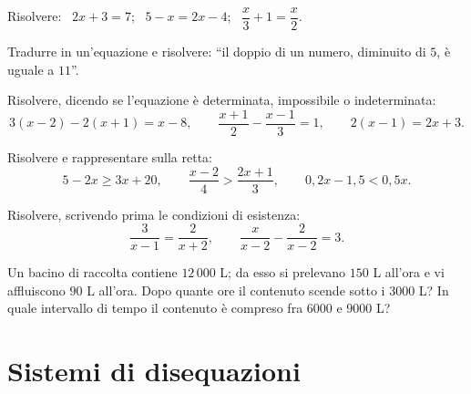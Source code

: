 \begin{esercizio}[\liv{1}]
Risolvere: \ $2x+3=7$; \ $5-x=2x-4$; \ $\dfrac x3+1=\dfrac x2$.
\end{esercizio}

\begin{esercizio}[\liv{1}]
Tradurre in un'equazione e risolvere: ``il doppio di un numero, diminuito di $5$, è uguale a $11$''.
\end{esercizio}

\begin{esercizio}[\liv{1}]
Risolvere, dicendo se l'equazione è determinata, impossibile o indeterminata:
\[
3(x-2)-2(x+1)=x-8,\qquad \frac{x+1}{2}-\frac{x-1}{3}=1,\qquad 2(x-1)=2x+3 .
\]
\end{esercizio}

\begin{esercizio}[\liv{1}]
Risolvere e rappresentare sulla retta:
\[
5-2x\ge3x+20,\qquad \frac{x-2}{4}>\frac{2x+1}{3},\qquad 0{,}2x-1{,}5<0{,}5x .
\]
\end{esercizio}

\begin{esercizio}[\liv{2}]
Risolvere, scrivendo prima le condizioni di esistenza:
\[
\frac{3}{x-1}=\frac{2}{x+2},\qquad \frac{x}{x-2}-\frac{2}{x-2}=3 .
\]
\end{esercizio}

\begin{esercizio}[\liv{2}]
Un bacino di raccolta contiene $12\,000$ L; da esso si prelevano $150$ L all'ora e vi affluiscono $90$ L all'ora. Dopo quante ore il contenuto scende sotto i $3000$ L? In quale intervallo di tempo il contenuto è compreso fra $6000$ e $9000$ L?
\end{esercizio}

\section{Sistemi di disequazioni}

